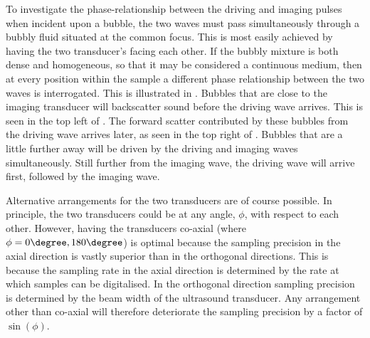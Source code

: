 To investigate the phase-relationship between the driving and imaging pulses
when incident upon a bubble,
the two waves must pass simultaneously through a bubbly fluid situated at the common focus.
This is most easily achieved by  having the two transducer's facing
each other. %
If the bubbly mixture is both dense and homogeneous,
so that it may be considered a continuous medium,
then at every position within the sample a different phase relationship
between the two waves is interrogated.
This is illustrated in .
Bubbles that are close to the imaging transducer will backscatter sound
before the driving wave arrives.  This is seen in the top left of .
The forward scatter contributed by these bubbles from the driving wave arrives later, as seen in the top right of .
Bubbles that are a little further away will be driven by the driving  and  imaging waves simultaneously.
Still further from the imaging wave, the driving wave will arrive first, followed by the imaging wave.

Alternative arrangements for the two transducers are of course possible.
In principle, the two transducers could be at any angle, $\phi$, with respect to each other.
However, having the transducers co-axial (where $\phi = 0\degree,180\degree$) is optimal because
the sampling precision in the axial direction is vastly superior than in the orthogonal directions.
This is because the sampling rate in the axial direction is determined by the rate at which samples can be digitalised.
In the orthogonal direction sampling precision  is determined by the beam width of the ultrasound transducer.
Any arrangement other than co-axial will therefore deteriorate the sampling precision by a factor of $\sin(\phi)$.

